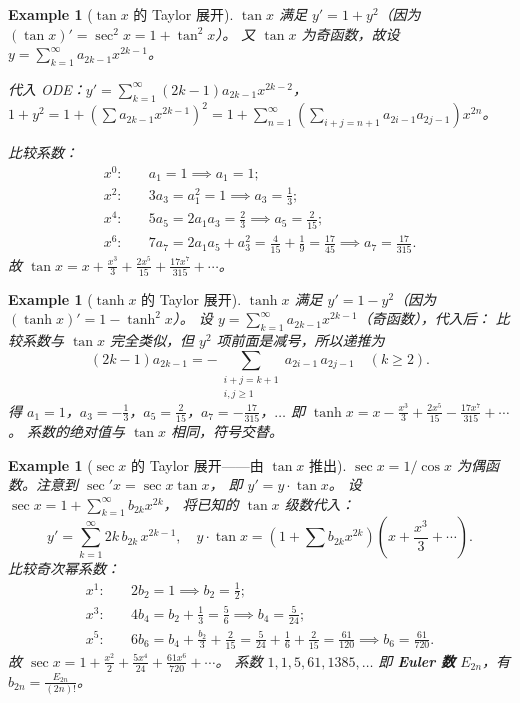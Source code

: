 \documentclass{ctexart}
\newtheorem{example}[theorem]{Example}
\begin{document}
\begin{example}[$\tan x$ 的 Taylor 展开]
  $\tan x$ 满足 $y' = 1 + y^2$（因为 $(\tan x)' = \sec^2 x = 1 + \tan^2 x$）。
  又 $\tan x$ 为奇函数，故设 $y = \sum_{k=1}^\infty a_{2k-1} x^{2k-1}$。

  代入 ODE：$y' = \sum_{k=1}^\infty (2k-1)a_{2k-1}x^{2k-2}$，
  $1 + y^2 = 1 + \left(\sum a_{2k-1}x^{2k-1}\right)^2
  = 1 + \sum_{n=1}^\infty\left(\sum_{i+j=n+1}a_{2i-1}a_{2j-1}\right)x^{2n}$。

  比较系数：
  \begin{align*}
    x^0:& \quad a_1 = 1 \implies a_1 = 1; \\
    x^2:& \quad 3a_3 = a_1^2 = 1 \implies a_3 = \frac{1}{3}; \\
    x^4:& \quad 5a_5 = 2a_1 a_3 = \frac{2}{3} \implies a_5 = \frac{2}{15}; \\
    x^6:& \quad 7a_7 = 2a_1 a_5 + a_3^2 = \frac{4}{15} + \frac{1}{9}
    = \frac{17}{45} \implies a_7 = \frac{17}{315}.
  \end{align*}
  故 $\tan x = x + \frac{x^3}{3} + \frac{2x^5}{15} + \frac{17x^7}{315} + \cdots$。
\end{example}

\begin{example}[$\tanh x$ 的 Taylor 展开]
  $\tanh x$ 满足 $y' = 1 - y^2$（因为 $(\tanh x)' = 1 - \tanh^2 x$）。
  设 $y = \sum_{k=1}^\infty a_{2k-1}x^{2k-1}$（奇函数），代入后：
  比较系数与 $\tan x$ 完全类似，但 $y^2$ 项前面是减号，所以递推为
  \[
    (2k-1)a_{2k-1} = -\!\!\sum_{\substack{i+j=k+1 \\ i,j \ge 1}} a_{2i-1}\,a_{2j-1}
    \quad (k \ge 2).
  \]
  得 $a_1=1$，$a_3 = -\frac{1}{3}$，$a_5 = \frac{2}{15}$，$a_7 = -\frac{17}{315}$，$\ldots$
  即 $\tanh x = x - \frac{x^3}{3} + \frac{2x^5}{15} - \frac{17x^7}{315} + \cdots$。
  系数的绝对值与 $\tan x$ 相同，符号交替。
\end{example}

\begin{example}[$\sec x$ 的 Taylor 展开——由 $\tan x$ 推出]
  $\sec x = 1/\cos x$ 为偶函数。注意到 $\sec' x = \sec x \tan x$，
  即 $y' = y \cdot \tan x$。
  设 $\sec x = 1 + \sum_{k=1}^\infty b_{2k}x^{2k}$，
  将已知的 $\tan x$ 级数代入：
  \[
    y' = \sum_{k=1}^\infty 2k\,b_{2k}\,x^{2k-1},
    \quad
    y\cdot\tan x = \left(1 + \sum b_{2k}x^{2k}\right)\!\left(x + \frac{x^3}{3} + \cdots\right).
  \]
  比较奇次幂系数：
  \begin{align*}
    x^1:& \quad 2b_2 = 1 \implies b_2 = \frac{1}{2}; \\
    x^3:& \quad 4b_4 = b_2 + \frac{1}{3} = \frac{5}{6} \implies b_4 = \frac{5}{24}; \\
    x^5:& \quad 6b_6 = b_4 + \frac{b_2}{3} + \frac{2}{15} = \frac{5}{24}+\frac{1}{6}+\frac{2}{15} = \frac{61}{120}
    \implies b_6 = \frac{61}{720}.
  \end{align*}
  故 $\sec x = 1 + \frac{x^2}{2} + \frac{5x^4}{24} + \frac{61x^6}{720} + \cdots$。
  系数 $1, 1, 5, 61, 1385, \ldots$ 即 \textbf{Euler 数} $E_{2n}$，有 $b_{2n} = \frac{E_{2n}}{(2n)!}$。
\end{example}
\end{document}
